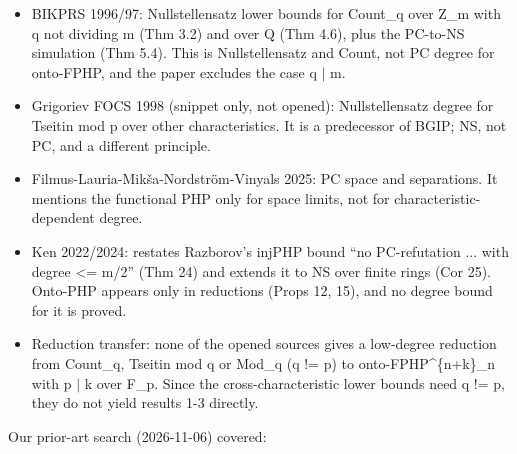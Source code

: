 \documentclass{article}
\begin{document}
\begin{itemize}
\item BIKPRS 1996/97: Nullstellensatz lower bounds for Count\_q over Z\_m with q not dividing m (Thm 3.2) and over Q (Thm 4.6), plus the PC-to-NS simulation (Thm 5.4). This is Nullstellensatz and Count, not PC degree for onto-FPHP, and the paper excludes the case q $\mid$ m.
\item Grigoriev FOCS 1998 (snippet only, not opened): Nullstellensatz degree for Tseitin mod p over other characteristics. It is a predecessor of BGIP; NS, not PC, and a different principle.
\item Filmus-Lauria-Mikša-Nordström-Vinyals 2025: PC space and separations. It mentions the functional PHP only for space limits, not for characteristic-dependent degree.
\item Ken 2022/2024: restates Razborov's injPHP bound ``no PC-refutation ... with degree \textless{}= m/2'' (Thm 24) and extends it to NS over finite rings (Cor 25). Onto-PHP appears only in reductions (Props 12, 15), and no degree bound for it is proved.
\item Reduction transfer: none of the opened sources gives a low-degree reduction from Count\_q, Tseitin mod q or Mod\_q (q != p) to onto-FPHP\textasciicircum{}\{n+k\}\_n with p $\mid$ k over F\_p. Since the cross-characteristic lower bounds need q != p, they do not yield results 1-3 directly.
\end{itemize}

Our prior-art search (2026-11-06) covered:
\end{document}
